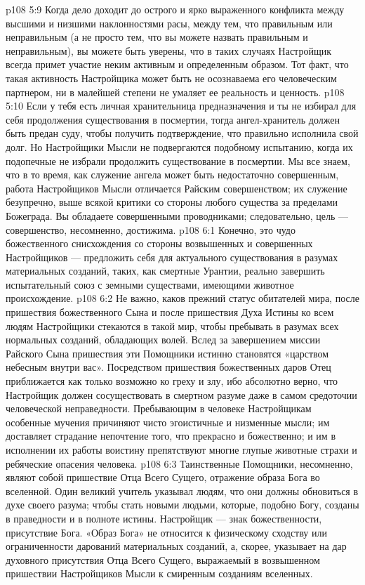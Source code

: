 \vs p108 5:9 Когда дело доходит до острого и ярко выраженного конфликта между высшими и низшими наклонностями расы, между тем, что  правильным или неправильным (а не просто тем, что вы можете назвать правильным и неправильным), вы можете быть уверены, что в таких случаях Настройщик всегда примет участие неким активным и определенным образом. Тот факт, что такая активность Настройщика может быть не осознаваема его человеческим партнером, ни в малейшей степени не умаляет ее реальность и ценность.
\vs p108 5:10 Если у тебя есть личная хранительница предназначения и ты не избирал для себя продолжения существования в посмертии, тогда ангел\hyp{}хранитель должен быть предан суду, чтобы получить подтверждение, что правильно исполнила свой долг. Но Настройщики Мысли не подвергаются подобному испытанию, когда их подопечные не избрали продолжить существование в посмертии. Мы все знаем, что в то время, как служение ангела может быть недостаточно совершенным, работа Настройщиков Мысли отличается Райским совершенством; их служение безупречно, выше всякой критики со стороны любого существа за пределами Божеграда. Вы обладаете совершенными проводниками; следовательно, цель --- совершенство, несомненно, достижима.
\vs p108 6:1 Конечно, это чудо божественного снисхождения со стороны возвышенных и совершенных Настройщиков --- предложить себя для актуального существования в разумах материальных созданий, таких, как смертные Урантии, реально завершить испытательный союз с земными существами, имеющими животное происхождение.
\vs p108 6:2 Не важно, каков прежний статус обитателей мира, после пришествия божественного Сына и после пришествия Духа Истины ко всем людям Настройщики стекаются в такой мир, чтобы пребывать в разумах всех нормальных созданий, обладающих волей. Вслед за завершением миссии Райского Сына пришествия эти Помощники истинно становятся «царством небесным внутри вас». Посредством пришествия божественных даров Отец приближается как только возможно ко греху и злу, ибо абсолютно верно, что Настройщик должен сосуществовать в смертном разуме даже в самом средоточии человеческой неправедности. Пребывающим в человеке Настройщикам особенные мучения причиняют чисто эгоистичные и низменные мысли; им доставляет страдание непочтение того, что прекрасно и божественно; и им в исполнении их работы воистину препятствуют многие глупые животные страхи и ребяческие опасения человека.
\vs p108 6:3 \pc Таинственные Помощники, несомненно, являют собой пришествие Отца Всего Сущего, отражение образа Бога во вселенной. Один великий учитель указывал людям, что они должны обновиться в духе своего разума; чтобы стать новыми людьми, которые, подобно Богу, созданы в праведности и в полноте истины. Настройщик --- знак божественности, присутствие Бога. «Образ Бога» не относится к физическому сходству или ограниченности дарований материальных созданий, а, скорее, указывает на дар духовного присутствия Отца Всего Сущего, выражаемый в возвышенном пришествии Настройщиков Мысли к смиренным созданиям вселенных.
